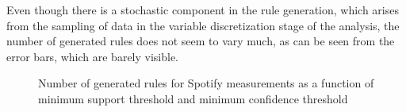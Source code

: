 Even though there is a stochastic component in the rule generation, which arises from the sampling of data in the variable discretization stage of the analysis, the number of generated rules does not seem to vary much, as can be seen from the error bars, which are barely visible.  


\begin{figure}[htp]


\caption{Number of generated rules for Spotify measurements as a function of minimum support threshold and minimum confidence threshold}
\label{figure:number-of-rules-spotify}
\end{figure}


